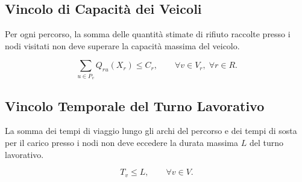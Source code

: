 \subsection{Vincolo di Capacità dei Veicoli}

Per ogni percorso, la somma delle quantità stimate di rifiuto raccolte presso i nodi visitati non deve superare la capacità massima del veicolo.

\begin{equation}
\sum_{u \in P_v} Q_{ru}(X_r) \le C_r,
\qquad \forall v \in V_r,\; \forall r \in R.
\end{equation}

\subsection{Vincolo Temporale del Turno Lavorativo}

La somma dei tempi di viaggio lungo gli archi del percorso e dei tempi di sosta per il carico presso i nodi non deve eccedere la durata massima $L$ del turno lavorativo.

\begin{equation}
T_v \le L,
\qquad \forall v \in V.
\end{equation}